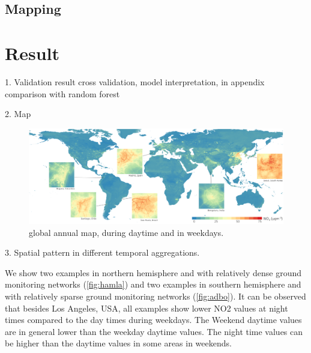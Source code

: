 \documentclass{article}
\begin{document}
 

\subsection{Mapping} 

\section{Result}
1. Validation result
cross validation, model interpretation, in appendix comparison with random forest
                   
2. Map
\begin{figure}
    \centering
    \includegraphics[width=\textwidth]{fig/glomap.png}
    \caption{global annual map, during daytime and in weekdays.}
    \label{fig:map}
\end{figure}

3. Spatial pattern in different temporal aggregations.

We show two examples in northern hemisphere and with relatively dense ground monitoring networks (\cref{fig:hamla}) and two examples in southern hemisphere and with relatively sparse ground monitoring networks (\cref{fig:adbo}). It can be observed that besides Los Angeles, USA, all examples show lower NO2 values at night times compared to the day times during weekdays. The Weekend daytime values are in general lower than the weekday daytime values. The night time values can be higher than the daytime values in some areas in weekends.   
 
\end{document}
